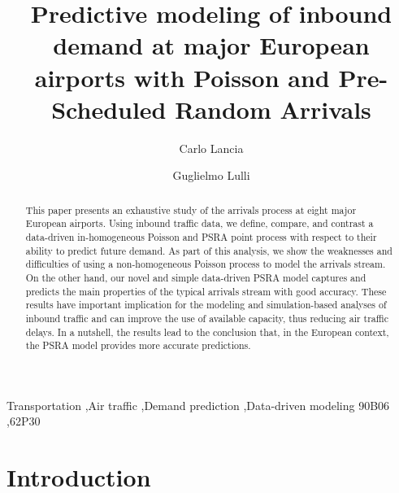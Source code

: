 \documentclass[draft,review]{elsarticle}
\begin{document}
\begin{frontmatter}

\title{Predictive modeling of inbound demand at major European airports with Poisson and Pre-Scheduled Random Arrivals}

\author[address_cl]{Carlo Lancia}

\author[address_gl]{Guglielmo Lulli}

\address[address_cl]{Leiden University Mathematical Institute, Niels Bohrweg 1, 2333 CA, Leiden, NL}
\address[address_gl]{
Department of Management Science \& Center for Transportation and Logistics,
Lancaster University Management School, Bailrigg, Lancaster, LA1 4YX, UK}

\begin{abstract}
  This paper presents an exhaustive study of the arrivals process at eight major European airports. Using inbound traffic data, we define, compare, and contrast a data-driven in-homogeneous Poisson and \ac{PSRA} point process with respect to their ability to predict future demand.
As part of this analysis, we show the weaknesses and difficulties of using a non-homogeneous Poisson process to model the arrivals stream. On the other hand, our novel and simple data-driven \ac{PSRA} model captures and predicts the main properties of the typical arrivals stream with good accuracy.
These results have important implication for the modeling and simulation-based analyses of inbound traffic and can improve the use of available capacity, thus reducing air traffic delays. In a nutshell, the results lead to the conclusion that, in the European context, the \ac{PSRA} model provides more accurate predictions.
\end{abstract}


\begin{keyword}
Transportation \sep Air traffic \sep Demand prediction \sep Data-driven modeling
\MSC[2010] 90B06 \sep  62P30
\end{keyword}

\end{frontmatter}


\section{Introduction}
\label{sec:introduction}
\end{document}
